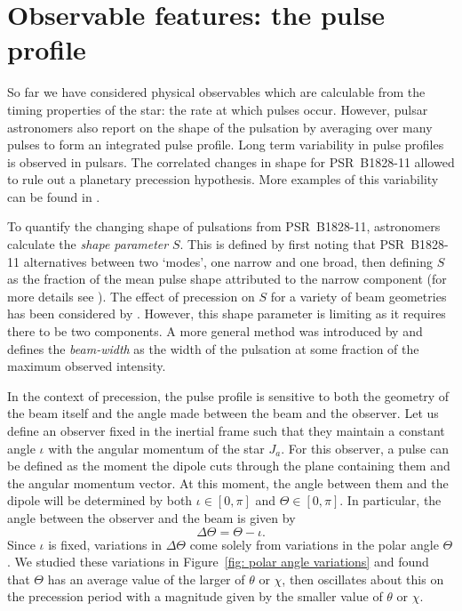 \documentclass[../full_thesis/full_thesis.tex]{subfiles}
\begin{document}
\section{Observable features: the pulse profile}
\label{sec: observable features: shape}

So far we have considered physical observables which are calculable from the
timing properties of the star: the rate at which pulses occur. However, pulsar
astronomers also report on the shape of the pulsation by averaging over many
pulses to form an integrated pulse profile.  Long term variability in pulse
profiles is observed in pulsars. The correlated changes in shape for
PSR~B1828-11 allowed \citet{Stairs2000} to rule out a planetary precession
hypothesis. More examples of this variability can be found in \citet{Lyne2010}.

To quantify the changing shape of pulsations from PSR~B1828-11, astronomers
calculate the \emph{shape parameter} $S$. This is defined by first noting that
PSR~B1828-11 alternatives between two `modes', one narrow and one broad, then
defining $S$ as the fraction of the mean pulse shape attributed to the narrow
component (for more details see \citet{Stairs2003}). The effect of
precession on $S$ for a variety of beam geometries has been considered by
\citet{Akgun2006}.  However, this shape parameter is limiting as it requires
there to be two components.  A more general method was introduced by
\citet{Lyne2010} and defines the \emph{beam-width} as the width of the
pulsation at some fraction of the maximum observed intensity.

In the context of precession, the pulse profile is sensitive to both the
geometry of the beam itself and the angle made between the beam and the
observer.  Let us define an observer fixed in the inertial frame such that they
maintain a constant angle $\iota$ with the angular momentum of the star $J_a$.
For this observer, a pulse can be defined as the moment the dipole cuts through
the plane containing them and the angular momentum vector. At this moment, the
angle between them and the dipole will be determined by both $\iota \in [0, \pi]$ and
$\Theta \in [0, \pi]$. In particular, the angle between the observer and the beam
is given by
\begin{equation}
\Delta\Theta = \Theta - \iota.
\label{eqn: delta Theta}
\end{equation}
Since $\iota$ is fixed, variations in $\Delta\Theta$ come solely from
variations in the polar angle $\Theta$. We studied these variations in
Figure~\ref{fig: polar angle variations} and found that $\Theta$ has an
average value of the larger of $\theta$ or $\chi$, then oscillates about this
on the precession period with a magnitude given by the smaller value of
$\theta$ or $\chi$.
\end{document}
